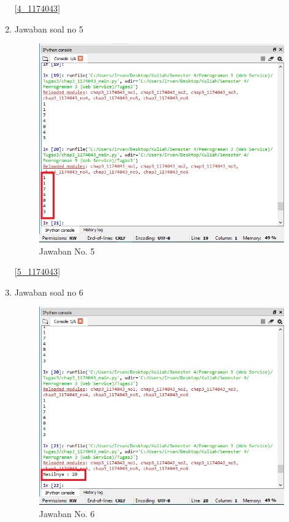 \begin{enumerate}
				\ref{4_1174043}
				
			\item Jawaban soal no 5
				
				
				\begin{figure} [ht]
					\centerline{\includegraphics[width=1\textwidth]{figures/chapter3/5_1174043.png}}
					\caption{Jawaban No. 5}
					\label{5}
				\end{figure}

				\ref{5_1174043}
				
			\item Jawaban soal no 6
				
				
				\begin{figure} [ht]
					\centerline{\includegraphics[width=1\textwidth]{figures/chapter3/6_1174043.png}}
					\caption{Jawaban No. 6}
					\label{6}
				\end{figure}


\end{enumerate}
